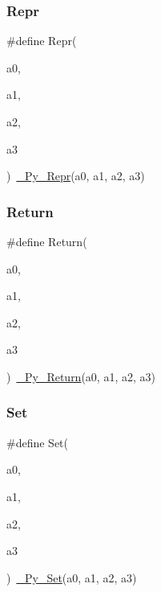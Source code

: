 \mbox{\label{_python-ast_8h_a88bd2651256da6ccebace0dfb90d8b72}} 
\subsubsection{\texorpdfstring{Repr}{Repr}}
{\footnotesize\ttfamily \#define Repr(\begin{DoxyParamCaption}\item[{}]{a0,  }\item[{}]{a1,  }\item[{}]{a2,  }\item[{}]{a3 }\end{DoxyParamCaption})~\mbox{\hyperlink{_python-ast_8h_aa19b82f9b129467bc767ddf64d7ede62}{\+\_\+\+Py\+\_\+\+Repr}}(a0, a1, a2, a3)}

\mbox{\label{_python-ast_8h_abdae7f49d66ce8e500825bb53aa14901}} 
\subsubsection{\texorpdfstring{Return}{Return}}
{\footnotesize\ttfamily \#define Return(\begin{DoxyParamCaption}\item[{}]{a0,  }\item[{}]{a1,  }\item[{}]{a2,  }\item[{}]{a3 }\end{DoxyParamCaption})~\mbox{\hyperlink{_python-ast_8h_a7119d853ac5d21a0aab782a16be84c6d}{\+\_\+\+Py\+\_\+\+Return}}(a0, a1, a2, a3)}

\mbox{\label{_python-ast_8h_a8b39bad9fda6bc73af75e4d6085bcf91}} 
\subsubsection{\texorpdfstring{Set}{Set}}
{\footnotesize\ttfamily \#define Set(\begin{DoxyParamCaption}\item[{}]{a0,  }\item[{}]{a1,  }\item[{}]{a2,  }\item[{}]{a3 }\end{DoxyParamCaption})~\mbox{\hyperlink{_python-ast_8h_adf1513b1fa378e46c866f0bb85194b5f}{\+\_\+\+Py\+\_\+\+Set}}(a0, a1, a2, a3)}

